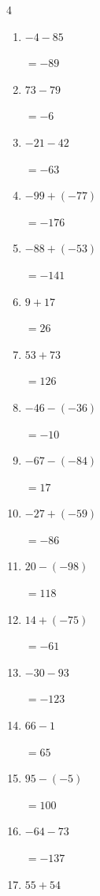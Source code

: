 \begin{multicols}{4}
\begin{enumerate}
        $=142$

  \item $-4-85$

        $=-89$

  \item $73-79$

        $=-6$

\columnbreak %

  \item $-21-42$

        $=-63$

  \item $-99+(-77)$

        $=-176$

  \item $-88+(-53)$

        $=-141$

  \item $9+17$

        $=26$

  \item $53+73$

        $=126$

  \item $-46-(-36)$

        $=-10$

  \item $-67-(-84)$

        $=17$

  \item $-27+(-59)$

        $=-86$

  \item $20-(-98)$

        $=118$

  \item $14+(-75)$

        $=-61$

  \item $-30-93$

        $=-123$

  \item $66-1$

        $=65$

  \item $95-(-5)$

        $=100$

  \item $-64-73$

        $=-137$

  \item $55+54$


\end{enumerate}
\end{multicols}
